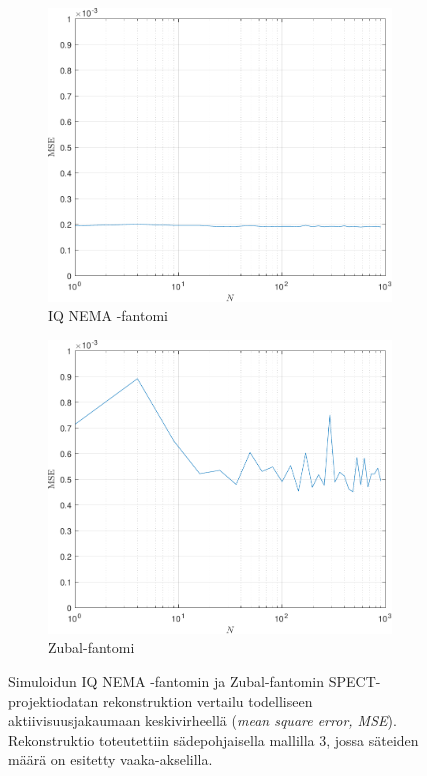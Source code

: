 \begin{figure}[H]
    \centering
    \captionsetup{width=.9\linewidth}
    \begin{subfigure}[t]{.4\textwidth}
        \includegraphics[width=\linewidth]{kuvat/nema_vertailu_MSE.pdf}
        \caption{IQ NEMA -fantomi}
    \end{subfigure}%
    \hspace{.1\textwidth}%
    \begin{subfigure}[t]{.4\textwidth}
        \includegraphics[width=\linewidth]{kuvat/cbf_vertailu_MSE.pdf}
        \caption{Zubal-fantomi}
    \end{subfigure}%
    \caption{Simuloidun IQ NEMA -fantomin ja Zubal-fantomin SPECT-projektiodatan rekonstruktion vertailu todelliseen aktiivisuusjakaumaan keskivirheellä (\textit{mean square error, MSE}). Rekonstruktio toteutettiin sädepohjaisella mallilla 3, jossa säteiden määrä on esitetty vaaka-akselilla.}
    \label{fig:vertailu_MSE}
\end{figure}
\fi

